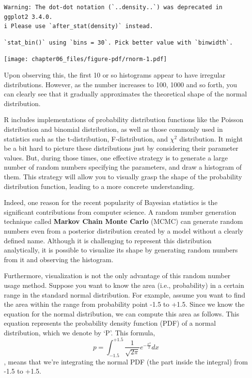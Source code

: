 \documentclass[
  a4paper,
]{book}
\begin{document}
\begin{verbatim}
Warning: The dot-dot notation (`..density..`) was deprecated in ggplot2 3.4.0.
i Please use `after_stat(density)` instead.
\end{verbatim}

\begin{verbatim}
`stat_bin()` using `bins = 30`. Pick better value with `binwidth`.
\end{verbatim}

\texttt{[image: chapter06\_files/figure-pdf/rnorm-1.pdf]}

Upon observing this, the first 10 or so histograms appear to have
irregular distributions. However, as the number increases to 100, 1000
and so forth, you can clearly see that it gradually approximates the
theoretical shape of the normal distribution.

R includes implementations of probability distribution functions like
the Poisson distribution and binomial distribution, as well as those
commonly used in statistics such as the t-distribution, F-distribution,
and \(\chi^2\) distribution. It might be a bit hard to picture these
distributions just by considering their parameter values. But, during
those times, one effective strategy is to generate a large number of
random numbers specifying the parameters, and draw a histogram of them.
This strategy will allow you to visually grasp the shape of the
probability distribution function, leading to a more concrete
understanding.

Indeed, one reason for the recent popularity of Bayesian statistics is
the significant contributions from computer science. A random number
generation technique called \textbf{Markov Chain Monte Carlo} (MCMC) can
generate random numbers even from a posterior distribution created by a
model without a clearly defined name. Although it is challenging to
represent this distribution analytically, it is possible to visualize
its shape by generating random numbers from it and observing the
histogram.

Furthermore, visualization is not the only advantage of this random
number usage method. Suppose you want to know the area (i.e.,
probability) in a certain range in the standard normal distribution. For
example, assume you want to find the area within the range from
probability point -1.5 to +1.5. Since we know the equation for the
normal distribution, we can compute this area as follows. This equation
represents the probability density function (PDF) of a normal
distribution, which we denote by `P'. This formula,
\[ p = \int_{-1.5}^{+1.5} \frac{1}{\sqrt{2\pi}}e^{-\frac{x^2}{2}} dx \],
means that we're integrating the normal PDF (the part inside the
integral) from -1.5 to +1.5.
\end{document}
